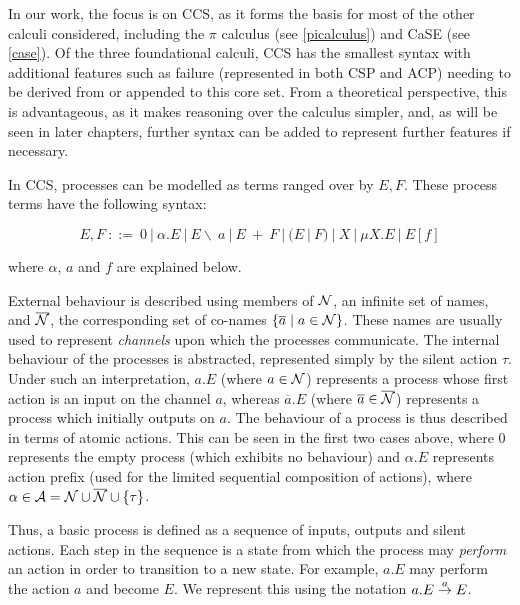 In our work, the focus is on CCS, as it forms the basis for most of
the other calculi considered, including the $\pi$ calculus
\cite{milner:pi} (see \ref{picalculus}) and CaSE \cite{CaSE} (see
\ref{case}).  Of the three foundational calculi, CCS has the smallest
syntax with additional features such as failure (represented in both
CSP and ACP) needing to be derived from or appended to this core set.
From a theoretical perspective, this is advantageous, as it makes
reasoning over the calculus simpler, and, as will be seen in later
chapters, further syntax can be added to represent further features if
necessary.

In CCS, processes can be modelled as terms ranged over by $E, F$.
These process terms have the following syntax:

\begin{equation}
\label{ccssyntax}
  E, F\ ::=\ 
  0\ |\ 
  \alpha.E\ |\ 
  E\backslash\ a\ |\ 
  E\ +\ F\ |\ 
  (E\ |\ F)\ |\ 
  X\ |\ 
  \mu X.E\ |\ 
  E[f] 
\end{equation}

\noindent where $\alpha$, $a$ and $f$ are explained below.

External behaviour is described using members of $\text{$\mathcal{N}$}$, an infinite
set of names, and $\overline{\text{$\mathcal{N}$}}$, the corresponding set of
co-names $\{\overline{a} \mid a \in \text{$\mathcal{N}$}\}$.  These names are usually
used to represent \emph{channels} upon which the processes
communicate.  The internal behaviour of the processes is abstracted,
represented simply by the silent action $\tau$.  Under such an
interpretation, $a.E$ (where $a \in \text{$\mathcal{N}$}$) represents a process
whose first action is an input on the channel $a$, whereas
$\overline{a}.E$ (where $\overline{a} \in \overline{\text{$\mathcal{N}$}}$)
represents a process which initially outputs on $a$.  The behaviour of
a process is thus described in terms of atomic actions.  This can be
seen in the first two cases above, where $0$ represents the empty
process (which exhibits no behaviour) and $\alpha.E$ represents action
prefix (used for the limited sequential composition of actions), where
$\alpha \in \text{$\mathcal{A}$} = \text{$\mathcal{N}$} \cup \overline{\text{$\mathcal{N}$}} \cup \{\tau\}$.

Thus, a basic process is defined as a sequence of inputs, outputs and
silent actions.  Each step in the sequence is a state from which the
process may \emph{perform} an action in order to transition to a new
state.  For example, $a.E$ may perform the action $a$ and become $E$.
We represent this using the notation $a.E \stackrel{a}{\rightarrow} E$.

